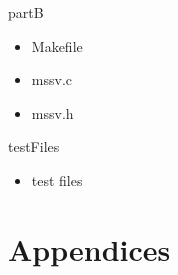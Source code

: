 \documentclass[]{article}
\begin{document}
partB
\begin{itemize}
	\item Makefile
	\item mssv.c
	\item mssv.h
\end{itemize}

testFiles
\begin{itemize}
	\item test files
\end{itemize}

\pagebreak



%
\nocite{*}
\printbibliography
%
\pagebreak
\section{Appendices}
\end{document}
